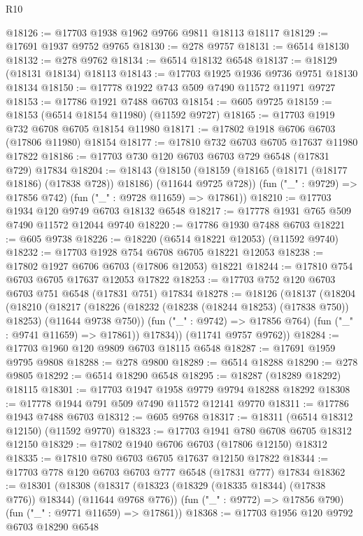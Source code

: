 \begin{lexlean}{R10}
\begin{coremodule}
@18126 := @17703 @1938 @1962 @9766 @9811 @18113 @18117
@18129 := @17691 @1937 @9752 @9765
@18130 := @278 @9757
@18131 := @6514 @18130
@18132 := @278 @9762
@18134 := @6514 @18132 @6548
@18137 := @18129 (@18131 @18134) @18113
@18143 := @17703 @1925 @1936 @9736 @9751 @18130 @18134
@18150 := @17778 @1922 @743 @509 @7490 @11572 @11971 @9727
@18153 := @17786 @1921 @7488 @6703
@18154 := @605 @9725
@18159 := @18153 (@6514 @18154 @11980) (@11592 @9727)
@18165 := @17703 @1919 @732 @6708 @6705 @18154 @11980
@18171 := @17802 @1918 @6706 @6703 (@17806 @11980) @18154
@18177 := @17810 @732 @6703 @6705 @17637 @11980 @17822
@18186 := @17703 @730 @120 @6703 @6703 @729 @6548 (@17831 @729) @17834
@18204 := @18143
    (@18150
      (@18159 (@18165 (@18171 (@18177 @18186) (@17838 @728)) @18186) (@11644 @9725 @728))
      (fun ("_" : @9729) => @17856 @742)
      (fun ("_" : @9728 @11659) => @17861))
@18210 := @17703 @1934 @120 @9749 @6703 @18132 @6548
@18217 := @17778 @1931 @765 @509 @7490 @11572 @12044 @9740
@18220 := @17786 @1930 @7488 @6703
@18221 := @605 @9738
@18226 := @18220 (@6514 @18221 @12053) (@11592 @9740)
@18232 := @17703 @1928 @754 @6708 @6705 @18221 @12053
@18238 := @17802 @1927 @6706 @6703 (@17806 @12053) @18221
@18244 := @17810 @754 @6703 @6705 @17637 @12053 @17822
@18253 := @17703 @752 @120 @6703 @6703 @751 @6548 (@17831 @751) @17834
@18278 := @18126
    (@18137
      (@18204
        (@18210
          (@18217
            (@18226 (@18232 (@18238 (@18244 @18253) (@17838 @750)) @18253) (@11644 @9738 @750))
            (fun ("_" : @9742) => @17856 @764)
            (fun ("_" : @9741 @11659) => @17861))
          @17834))
      (@11741 @9757 @9762))
@18284 := @17703 @1960 @120 @9809 @6703 @18115 @6548
@18287 := @17691 @1959 @9795 @9808
@18288 := @278 @9800
@18289 := @6514 @18288
@18290 := @278 @9805
@18292 := @6514 @18290 @6548
@18295 := @18287 (@18289 @18292) @18115
@18301 := @17703 @1947 @1958 @9779 @9794 @18288 @18292
@18308 := @17778 @1944 @791 @509 @7490 @11572 @12141 @9770
@18311 := @17786 @1943 @7488 @6703
@18312 := @605 @9768
@18317 := @18311 (@6514 @18312 @12150) (@11592 @9770)
@18323 := @17703 @1941 @780 @6708 @6705 @18312 @12150
@18329 := @17802 @1940 @6706 @6703 (@17806 @12150) @18312
@18335 := @17810 @780 @6703 @6705 @17637 @12150 @17822
@18344 := @17703 @778 @120 @6703 @6703 @777 @6548 (@17831 @777) @17834
@18362 := @18301
    (@18308
      (@18317 (@18323 (@18329 (@18335 @18344) (@17838 @776)) @18344) (@11644 @9768 @776))
      (fun ("_" : @9772) => @17856 @790)
      (fun ("_" : @9771 @11659) => @17861))
@18368 := @17703 @1956 @120 @9792 @6703 @18290 @6548

\end{coremodule}
\end{lexlean}
